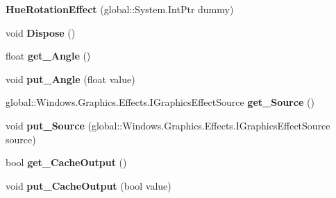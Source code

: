 \begin{DoxyCompactItemize}
{\bfseries Hue\+Rotation\+Effect} (global\+::\+System.\+Int\+Ptr dummy)
\item 
\mbox{\label{class_microsoft_1_1_graphics_1_1_canvas_1_1_effects_1_1_hue_rotation_effect_a810d0ccc36d934585b46ee347f904a5a}} 
void {\bfseries Dispose} ()
\item 
\mbox{\label{class_microsoft_1_1_graphics_1_1_canvas_1_1_effects_1_1_hue_rotation_effect_a3a3718dbc379b4681eef27cfbf8da3b1}} 
float {\bfseries get\+\_\+\+Angle} ()
\item 
\mbox{\label{class_microsoft_1_1_graphics_1_1_canvas_1_1_effects_1_1_hue_rotation_effect_ae9759f57343903aac17e06caa7782f14}} 
void {\bfseries put\+\_\+\+Angle} (float value)
\item 
\mbox{\label{class_microsoft_1_1_graphics_1_1_canvas_1_1_effects_1_1_hue_rotation_effect_a17269efe1df5109e5fb12abe58b92834}} 
global\+::\+Windows.\+Graphics.\+Effects.\+I\+Graphics\+Effect\+Source {\bfseries get\+\_\+\+Source} ()
\item 
\mbox{\label{class_microsoft_1_1_graphics_1_1_canvas_1_1_effects_1_1_hue_rotation_effect_aa5c933e9d4e46941d0bc0dfbadd47e44}} 
void {\bfseries put\+\_\+\+Source} (global\+::\+Windows.\+Graphics.\+Effects.\+I\+Graphics\+Effect\+Source source)
\item 
\mbox{\label{class_microsoft_1_1_graphics_1_1_canvas_1_1_effects_1_1_hue_rotation_effect_a212f0bc97efd7322e740a5daef23bfc8}} 
bool {\bfseries get\+\_\+\+Cache\+Output} ()
\item 
\mbox{\label{class_microsoft_1_1_graphics_1_1_canvas_1_1_effects_1_1_hue_rotation_effect_a611b8e8d5501b86bc3ed437b0f5dac98}} 
void {\bfseries put\+\_\+\+Cache\+Output} (bool value)
\item 

\end{DoxyCompactItemize}
